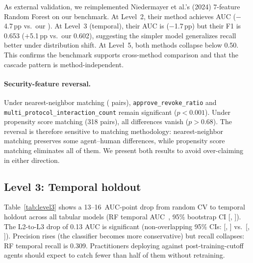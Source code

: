 \documentclass[10pt]{article}
\begin{document}
As external validation, we reimplemented Niedermayer et al.'s (2024) 7-feature Random Forest on our benchmark. At Level~2, their method achieves AUC \externalNiedermayerCvAuc{} ($-$4.7\,pp vs.\ our \externalOursCvAuc{}). At Level~3 (temporal), their AUC is \externalNiedermayerTemporalAuc{} ($-$1.7\,pp) but their F1 is 0.653 ($+$5.1\,pp vs.\ our 0.602), suggesting the simpler model generalizes recall better under distribution shift. At Level~5, both methods collapse below 0.50. This confirms the benchmark supports cross-method comparison and that the cascade pattern is method-independent.

\paragraph{Security-feature reversal.} Under nearest-neighbor matching (\datasetNAgents{} pairs), \texttt{approve\_revoke\_ratio} and \texttt{multi\_protocol\_interaction\_count} remain significant ($p < 0.001$). Under propensity score matching (318 pairs), all differences vanish ($p > 0.68$). The reversal is therefore sensitive to matching methodology: nearest-neighbor matching preserves some agent--human differences, while propensity score matching eliminates all of them. We present both results to avoid over-claiming in either direction.

\subsection{Level 3: Temporal holdout}

Table~\ref{tab:level3} shows a 13--16~AUC-point drop from random CV to temporal holdout across all tabular models (RF temporal AUC~\temporalHoldoutRfAuc{}, 95\% bootstrap CI [\bootstrapLevelRfAucCiLoB{}, \bootstrapLevelRfAucCiHiB{}]). The L2-to-L3 drop of 0.13 AUC is significant (non-overlapping 95\% CIs: [\bootstrapLevelRfAucCiLo{}, \bootstrapLevelRfAucCiHi{}] vs.\ [\bootstrapLevelRfAucCiLoB{}, \bootstrapLevelRfAucCiHiB{}]). Precision rises (the classifier becomes more conservative) but recall collapses: RF temporal recall is 0.309. Practitioners deploying against post-training-cutoff agents should expect to catch fewer than half of them without retraining.
\end{document}
